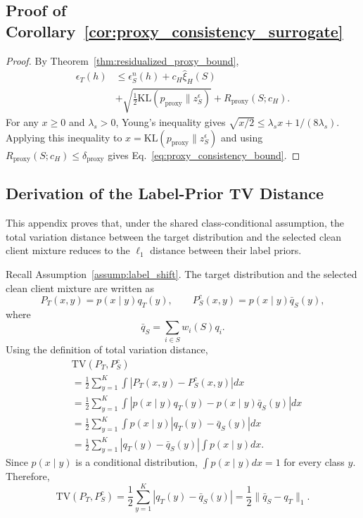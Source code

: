 \documentclass[conference]{IEEEtran}
\theoremstyle{definition}
\theoremstyle{remark}
\begin{document}
\subsection{Proof of Corollary~\ref{cor:proxy_consistency_surrogate}}
\begin{proof}
By Theorem~\ref{thm:residualized_proxy_bound},
\begin{align}
\epsilon_T(h)
&\le
\epsilon_S^n(h)
+
c_H\widehat{\xi}_{H}(S) \\
&
+
\sqrt{
\frac12
\mathrm{KL}
\left(
p_{\mathrm{proxy}}\|z_S^\epsilon
\right)
}
+
R_{\mathrm{proxy}}(S;c_H).
\end{align}
For any $x\ge0$ and $\lambda_s>0$, Young's inequality gives
$\sqrt{x/2}\le \lambda_s x + 1/(8\lambda_s)$.
Applying this inequality to $x=\mathrm{KL}(p_{\mathrm{proxy}}\|z_S^\epsilon)$ and using
$R_{\mathrm{proxy}}(S;c_H)\le\delta_{\mathrm{proxy}}$ gives Eq.~\eqref{eq:proxy_consistency_bound}.
\end{proof}
\subsection{Derivation of the Label-Prior TV Distance}
\label{app:tv_label_prior}

This appendix proves that, under the shared class-conditional assumption, the total variation distance between the target distribution and the selected clean client mixture reduces to the $\ell_1$ distance between their label priors.

Recall Assumption~\ref{assump:label_shift}. 
The target distribution and the selected clean client mixture are written as
\[
P_T(x,y)=p(x\mid y)q_T(y),
\qquad
P_S^c(x,y)=p(x\mid y)\bar q_S(y),
\]
where
\[
\bar q_S=\sum_{i\in S}w_i(S)q_i.
\]
Using the definition of total variation distance,
\begin{align}
&\mathrm{TV}(P_T,P_S^c)\\
&=
\frac{1}{2}
\sum_{y=1}^{K}
\int
\left|
P_T(x,y)-P_S^c(x,y)
\right|
dx \\
&=
\frac{1}{2}
\sum_{y=1}^{K}
\int
\left|
p(x\mid y)q_T(y)
-
p(x\mid y)\bar q_S(y)
\right|
dx \\
&=
\frac{1}{2}
\sum_{y=1}^{K}
\int
p(x\mid y)
\left|
q_T(y)-\bar q_S(y)
\right|
dx \\
&=
\frac{1}{2}
\sum_{y=1}^{K}
\left|
q_T(y)-\bar q_S(y)
\right|
\int p(x\mid y)dx.
\end{align}
Since $p(x\mid y)$ is a conditional distribution, $\int p(x\mid y)dx=1$ for every class $y$. 
Therefore,
\begin{equation}
\mathrm{TV}(P_T,P_S^c)
=
\frac{1}{2}
\sum_{y=1}^{K}
\left|
q_T(y)-\bar q_S(y)
\right|
=
\frac{1}{2}
\|\bar q_S-q_T\|_1.
\end{equation}
\end{document}
